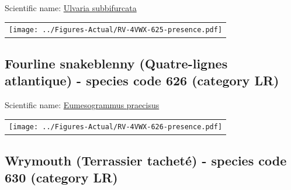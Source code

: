 \documentclass[12pt]{article}\usepackage[]{graphicx}\usepackage[]{color}
\begin{document}

Scientific name: \href{http://www.marinespecies.org/aphia.php?p=taxdetails\&id=159821}{Ulvaria subbifurcata} \newline
\begin{minipage}{1.0\textwidth}
 \begin{tabular}{c}
\texttt{[image: ../Figures-Actual/RV-4VWX-625-presence.pdf]} \\ 
\end{tabular} 
\end{minipage}
\clearpage

\renewcommand\thefigure{\thesubsection\Alph{figure}}

\setcounter{figure}{0}

\hypertarget{sec:626}{%
\subsection{Fourline snakeblenny (Quatre-lignes atlantique) - species code 626 (category LR)}\label{sec:626}}

  


Scientific name: \href{http://www.marinespecies.org/aphia.php?p=taxdetails\&id=159817}{Eumesogrammus praecisus} \newline
\begin{minipage}{1.0\textwidth}
 \begin{tabular}{c}
\texttt{[image: ../Figures-Actual/RV-4VWX-626-presence.pdf]} \\ 
\end{tabular} 
\end{minipage}
\clearpage

\renewcommand\thefigure{\thesubsection\Alph{figure}}

\setcounter{figure}{0}

\hypertarget{sec:630}{%
\subsection{Wrymouth (Terrassier tacheté) - species code 630 (category LR)}\label{sec:630}}

  
\end{document}
